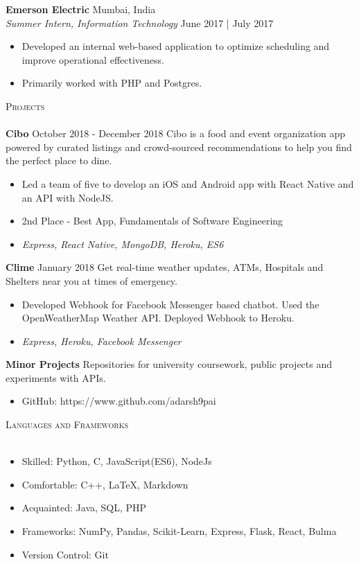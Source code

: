 \documentclass[a4paper]{article}
\newcommand{\lineunder} {
    \vspace*{-8pt} \\
    \hspace*{-18pt} \hrulefill \\
}
\newcommand{\header} [1] {
    {\hspace*{-18pt}\vspace*{6pt} \textsc{#1}}
    \vspace*{-6pt} \lineunder
}
\begin{document}
\textbf{Emerson Electric} \hfill Mumbai, India\\
\textit{Summer Intern, Information Technology} \hfill June 2017 | July 2017\\
\vspace{-1mm}
\begin{itemize} \itemsep 1pt
	\item Developed an internal web-based application to optimize scheduling and improve operational effectiveness.
	\item Primarily worked with PHP and Postgres.
\end{itemize}


\vspace{2mm}

\header{Projects}
{\textbf{Cibo}} October 2018 - December 2018 \hspace{1mm} Cibo is a food and event organization app powered by curated listings and crowd-sourced recommendations to help you find the perfect place to dine. 
\begin{itemize}
\item Led a team of five to develop an iOS and Android app with React Native and an API with NodeJS.
\item 2nd Place - Best App, Fundamentals of Software Engineering
\item \textit{Express, React Native, MongoDB, Heroku, ES6} 
\end{itemize}
\vspace*{2mm}
{\textbf{Clime}} January 2018 \hspace{1mm} Get real-time weather updates, ATMs, Hospitals and Shelters near you at times of emergency.
\begin{itemize}
\item Developed Webhook for Facebook Messenger based chatbot. Used the OpenWeatherMap Weather API. Deployed Webhook to Heroku.
\item \textit{Express, Heroku, Facebook Messenger}
\end{itemize}
\textbf{Minor Projects} Repositories for university coursework, public projects and experiments with APIs. 
\begin{itemize}
\item GitHub: https://www.github.com/adarsh9pai
\end{itemize}
\vspace{2mm}

\header{Languages and Frameworks}
\begin{itemize}
\item Skilled: Python, C, JavaScript(ES6), NodeJs
\item Comfortable: C++, \LaTeX, Markdown
\item Acquainted: Java, SQL, PHP
\item Frameworks: NumPy, Pandas, Scikit-Learn, Express, Flask, React, Bulma
\item Version Control: Git
\end{itemize}

\vspace{2mm}
\end{document}
